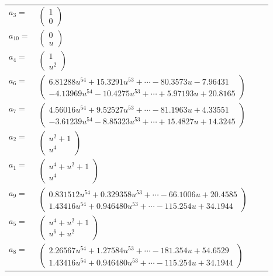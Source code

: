 \documentclass[1p]{elsarticle_modified}
\theoremstyle{definition}
\begin{document}
\begin{tabular}{m{7pt} m{180pt} m{7pt} m{180pt} }
\flushright $a_{3}=$&$\begin{pmatrix}1\\0\end{pmatrix}$ \\
\flushright $a_{10}=$&$\begin{pmatrix}0\\u\end{pmatrix}$ \\
\flushright $a_{4}=$&$\begin{pmatrix}1\\u^2\end{pmatrix}$ \\
\flushright $a_{6}=$&$\begin{pmatrix}6.81288 u^{54}+15.3291 u^{53}+\cdots-80.3573 u-7.96431\\-4.13969 u^{54}-10.4275 u^{53}+\cdots+5.97193 u+20.8165\end{pmatrix}$ \\
\flushright $a_{7}=$&$\begin{pmatrix}4.56016 u^{54}+9.52527 u^{53}+\cdots-81.1963 u+4.33551\\-3.61239 u^{54}-8.85323 u^{53}+\cdots+15.4827 u+14.3245\end{pmatrix}$ \\
\flushright $a_{2}=$&$\begin{pmatrix}u^2+1\\u^4\end{pmatrix}$ \\
\flushright $a_{1}=$&$\begin{pmatrix}u^4+u^2+1\\u^4\end{pmatrix}$ \\
\flushright $a_{9}=$&$\begin{pmatrix}0.831512 u^{54}+0.329358 u^{53}+\cdots-66.1006 u+20.4585\\1.43416 u^{54}+0.946480 u^{53}+\cdots-115.254 u+34.1944\end{pmatrix}$ \\
\flushright $a_{5}=$&$\begin{pmatrix}u^4+u^2+1\\u^6+u^2\end{pmatrix}$ \\
\flushright $a_{8}=$&$\begin{pmatrix}2.26567 u^{54}+1.27584 u^{53}+\cdots-181.354 u+54.6529\\1.43416 u^{54}+0.946480 u^{53}+\cdots-115.254 u+34.1944\end{pmatrix}$ \\

\end{tabular}
\end{document}
